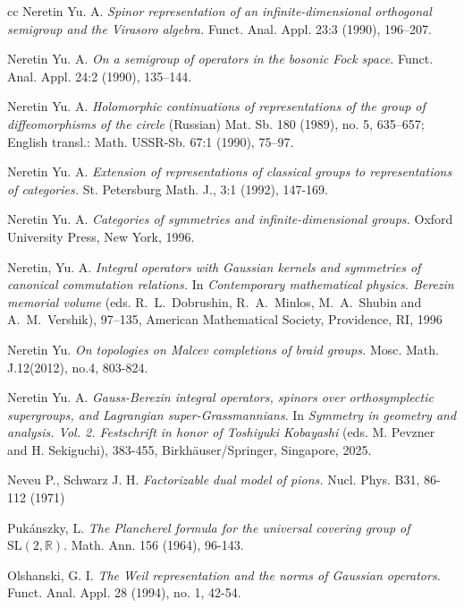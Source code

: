 \documentclass[]{amsart}
\def\SL{\mathrm {SL}}
\def\OSp{\mathrm {OSp}}
\def\R {{\mathbb R }}
\begin{document}
\begin{thebibliography}{cc}
Neretin Yu. A. {\it Spinor representation
of an infinite-dimensional
 orthogonal semigroup and the Virasoro algebra.}
 Funct. Anal. Appl.  23:3  (1990),  196--207.

Neretin Yu. A.
{\it On a semigroup of operators in the bosonic Fock space.}
 Funct. Anal. Appl.  24:2  (1990),  135--144.


 
 Neretin Yu. A. {\it Holomorphic continuations of representations of the group of diffeomorphisms of the circle}
 (Russian)
 Mat. Sb. 180 (1989), no. 5, 635–657; English transl.:
 Math. USSR-Sb. 67:1 (1990),  75--97.
 
Neretin Yu. A. {\it Extension of representations of classical groups to representations of categories.} St. Petersburg Math. J.,
 3:1 (1992), 147-169. 

Neretin Yu. A. {\it Categories of symmetries and
infinite-dimensional groups.}
 Oxford University Press, New York, 1996.
 
 Neretin, Yu. A.
 {\it Integral operators with Gaussian kernels and symmetries of canonical commutation relations.} 
 In 
 {\it Contemporary mathematical physics. Berezin memorial volume} (eds. R.~L.~Dobrushin, R.~A.~Minlos, M.~A.~Shubin and A.~M.~Vershik), 97–135,
 American Mathematical Society, Providence, RI, 1996

 Neretin Yu.
{\it On topologies on Malcev completions of braid groups.}  Mosc. Math. J.12(2012), no.4, 803-824.


Neretin Yu. A.
{\it Gauss-Berezin integral operators, spinors over orthosymplectic supergroups, and Lagrangian super-Grassmannians}. In {\it Symmetry in geometry and analysis. Vol. 2. Festschrift in honor of Toshiyuki Kobayashi} (eds. M. Pevzner and H. Sekiguchi), 383-455,
Birkh\"auser/Springer, Singapore, 2025.



Neveu P., Schwarz J. H. {\it Factorizable dual model of pions.} Nucl. Phys. B31, 86-112 (1971)

Puk\'anszky, L.
{\it The Plancherel formula for the universal covering group of 
$\SL(2,\R)$}. Math. Ann. 156 (1964), 96-143.
  
Olshanski, G. I.
{\it The Weil representation and the norms of Gaussian operators.}
Funct. Anal. Appl. 28 (1994), no. 1, 42-54.


\end{thebibliography}
\end{document}
